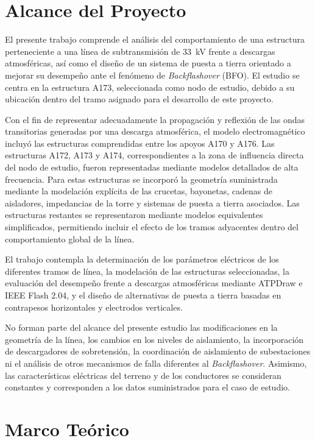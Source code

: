 \documentclass[12pt,letterpaper]{article}
\begin{document}
\section{Alcance del Proyecto}

El presente trabajo comprende el análisis del comportamiento de una estructura perteneciente a una línea de subtransmisión de \SI{33}{\kilo\volt} frente a descargas atmosféricas, así como el diseño de un sistema de puesta a tierra orientado a mejorar su desempeño ante el fenómeno de \textit{Backflashover} (BFO). El estudio se centra en la estructura A173, seleccionada como nodo de estudio, debido a su ubicación dentro del tramo asignado para el desarrollo de este proyecto.

Con el fin de representar adecuadamente la propagación y reflexión de las ondas transitorias generadas por una descarga atmosférica, el modelo electromagnético incluyó las estructuras comprendidas entre los apoyos A170 y A176. Las estructuras A172, A173 y A174, correspondientes a la zona de influencia directa del nodo de estudio, fueron representadas mediante modelos detallados de alta frecuencia. Para estas estructuras se incorporó la geometría suministrada mediante la modelación explícita de las crucetas, bayonetas, cadenas de aisladores, impedancias de la torre y sistemas de puesta a tierra asociados. Las estructuras restantes se representaron mediante modelos equivalentes simplificados, permitiendo incluir el efecto de los tramos adyacentes dentro del comportamiento global de la línea.


El trabajo contempla la determinación de los parámetros eléctricos de los diferentes tramos de línea, la modelación de las estructuras seleccionadas, la evaluación del desempeño frente a descargas atmosféricas mediante ATPDraw e IEEE Flash 2.04, y el diseño de alternativas de puesta a tierra basadas en contrapesos horizontales y electrodos verticales.

No forman parte del alcance del presente estudio las modificaciones en la geometría de la línea, los cambios en los niveles de aislamiento, la incorporación de descargadores de sobretensión, la coordinación de aislamiento de subestaciones ni el análisis de otros mecanismos de falla diferentes al \textit{Backflashover}. Asimismo, las características eléctricas del terreno y de los conductores se consideran constantes y corresponden a los datos suministrados para el caso de estudio.


\section{Marco Teórico}
\end{document}
